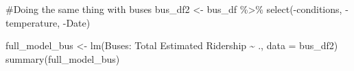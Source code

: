 \documentclass[
  letterpaper,
  DIV=11,
  numbers=noendperiod]{scrartcl}
\newenvironment{Shaded}{\begin{snugshade}}{\end{snugshade}}
\newcommand{\AttributeTok}[1]{\textcolor[rgb]{0.40,0.45,0.13}{#1}}
\newcommand{\CommentTok}[1]{\textcolor[rgb]{0.37,0.37,0.37}{#1}}
\newcommand{\FunctionTok}[1]{\textcolor[rgb]{0.28,0.35,0.67}{#1}}
\newcommand{\NormalTok}[1]{\textcolor[rgb]{0.00,0.23,0.31}{#1}}
\newcommand{\OtherTok}[1]{\textcolor[rgb]{0.00,0.23,0.31}{#1}}
\newcommand{\SpecialCharTok}[1]{\textcolor[rgb]{0.37,0.37,0.37}{#1}}
\newcommand{\StringTok}[1]{\textcolor[rgb]{0.13,0.47,0.30}{#1}}
\begin{document}
\begin{Shaded}
\begin{Highlighting}[]
\CommentTok{\#Doing the same thing with buses}
\NormalTok{bus\_df2 }\OtherTok{\textless{}{-}}  
\NormalTok{  bus\_df }\SpecialCharTok{\%\textgreater{}\%}
  \FunctionTok{select}\NormalTok{(}\SpecialCharTok{{-}}\NormalTok{conditions,}
         \SpecialCharTok{{-}}\NormalTok{temperature,}
         \SpecialCharTok{{-}}\NormalTok{Date)}

\NormalTok{full\_model\_bus }\OtherTok{\textless{}{-}} \FunctionTok{lm}\NormalTok{(}\StringTok{\textasciigrave{}}\AttributeTok{Buses: Total Estimated Ridership}\StringTok{\textasciigrave{}} \SpecialCharTok{\textasciitilde{}}\NormalTok{ ., }\AttributeTok{data =}\NormalTok{ bus\_df2)}
\FunctionTok{summary}\NormalTok{(full\_model\_bus)}
\end{Highlighting}
\end{Shaded}
\end{document}
